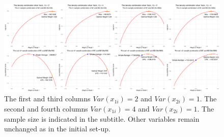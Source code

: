 \documentclass{monashthesis}
\begin{document}
\begin{figure}[ht]
\centering
\includegraphics[scale=0.18, angle=90]{figures/var11.jpg}
\caption{The first and third columns $Var(x_{1i}) = 2$ and $Var(x_{2i}) = 1$. The second and fourth columns $Var(x_{1i}) = 4$ and $Var(x_{2i}) = 1$. The sample size is indicated in the subtitle. Other variables remain unchanged as in the initial set-up.}
\label{fig:variance}
\end{figure}

\printbibliography[title={Reference}]
\end{document}
